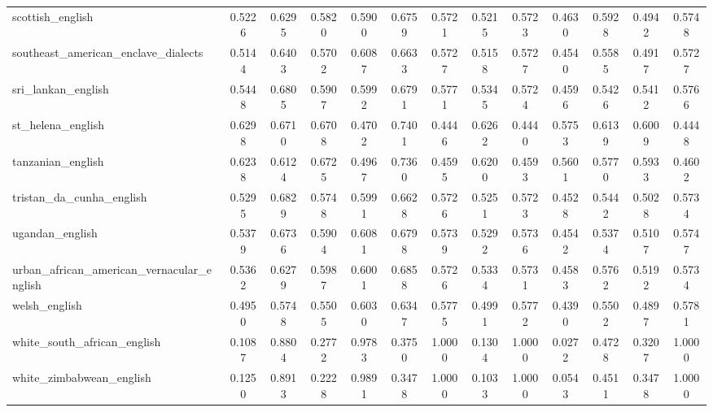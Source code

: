 \begin{landscape}
\begin{longtable}{lcccccccccccc}
scottish\_english & 0.5226 & 0.6295 & 0.5820 & 0.5900 & 0.6759 & 0.5721 & 0.5215 & 0.5723 & 0.4630 & 0.5928 & 0.4942 & 0.5748 \\
southeast\_american\_enclave\_dialects & 0.5144 & 0.6403 & 0.5702 & 0.6087 & 0.6633 & 0.5727 & 0.5158 & 0.5727 & 0.4540 & 0.5585 & 0.4917 & 0.5727 \\
sri\_lankan\_english & 0.5448 & 0.6805 & 0.5907 & 0.5992 & 0.6791 & 0.5771 & 0.5345 & 0.5724 & 0.4596 & 0.5426 & 0.5412 & 0.5766 \\
st\_helena\_english & 0.6298 & 0.6710 & 0.6708 & 0.4702 & 0.7401 & 0.4446 & 0.6262 & 0.4440 & 0.5753 & 0.6139 & 0.6009 & 0.4448 \\
tanzanian\_english & 0.6238 & 0.6124 & 0.6725 & 0.4967 & 0.7360 & 0.4595 & 0.6200 & 0.4593 & 0.5601 & 0.5770 & 0.5933 & 0.4602 \\
tristan\_da\_cunha\_english & 0.5295 & 0.6829 & 0.5748 & 0.5991 & 0.6628 & 0.5726 & 0.5251 & 0.5723 & 0.4528 & 0.5442 & 0.5028 & 0.5734 \\
ugandan\_english & 0.5379 & 0.6736 & 0.5904 & 0.6081 & 0.6798 & 0.5739 & 0.5292 & 0.5736 & 0.4542 & 0.5374 & 0.5107 & 0.5747 \\
urban\_african\_american\_vernacular\_english & 0.5362 & 0.6279 & 0.5987 & 0.6001 & 0.6858 & 0.5726 & 0.5334 & 0.5731 & 0.4583 & 0.5762 & 0.5192 & 0.5734 \\
welsh\_english & 0.4950 & 0.5748 & 0.5505 & 0.6030 & 0.6347 & 0.5775 & 0.4991 & 0.5772 & 0.4390 & 0.5502 & 0.4897 & 0.5781 \\
white\_south\_african\_english & 0.1087 & 0.8804 & 0.2772 & 0.9783 & 0.3750 & 1.0000 & 0.1304 & 1.0000 & 0.0272 & 0.4728 & 0.3207 & 1.0000 \\
white\_zimbabwean\_english & 0.1250 & 0.8913 & 0.2228 & 0.9891 & 0.3478 & 1.0000 & 0.1033 & 1.0000 & 0.0543 & 0.4511 & 0.3478 & 1.0000 \\
\bottomrule
\end{longtable}
\end{landscape}